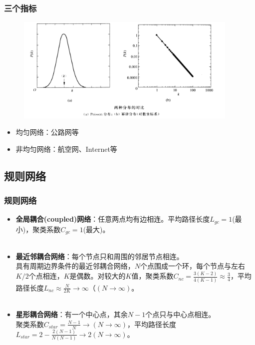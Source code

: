 \begin{frame}
	\frametitle{三个指标}
	\begin{figure}[htbp]
		\centering
		\includegraphics[width=0.95\textwidth, bb = 0 0 1365 652]{pic/01-pandp.png}
	\end{figure}
	\begin{itemize}
		\item 均匀网络：公路网等
		\item 非均匀网络：航空网、Internet等
	\end{itemize}
	
\end{frame}

\subsection*{规则网络}

	\begin{frame}
	\frametitle{规则网络}
	
		\begin{itemize}
		\item \textbf{全局耦合(coupled)网络}：任意两点均有边相连。平均路径长度$L_{gc}=1$(最小)，聚类系数$C_{gc}=1$(最大)。 \\ ~\\
		\item \textbf{最近邻耦合网络}：每个节点只和周围的邻居节点相连。\\ 
				具有周期边界条件的最近邻耦合网络，$N$个点围成一个环，每个节点与左右$K/2$个点相连，$K$是偶数。对较大的$K$值，聚类系数$C_{nc}=\frac{3(K-2)}{4(K-1)}\approx\frac{3}{4}$，平均路径长度$L_{nc}\approx \frac{N}{2K} \rightarrow \infty （(N \rightarrow \infty)$。 \\ ~\\
		\item \textbf{星形耦合网络}：有一个中心点，其余$N-1$个点只与中心点相连。\\ 
				聚类系数$C_{star}=\frac{N-1}{N} \rightarrow (N \rightarrow \infty)$，平均路径长度$L_{star}=2- \frac{2(N-1)}{N(N-1)} \rightarrow 2 (N \rightarrow \infty)$。
		\end{itemize}

	\end{frame}

